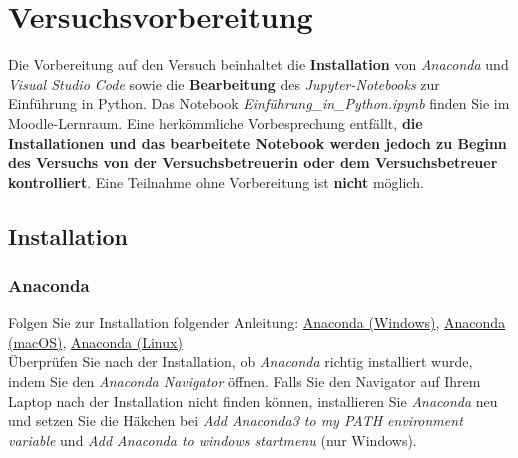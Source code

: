 \documentclass[12pt]{scrbook}
\begin{document}
\section{Versuchsvorbereitung}
\label{PY:Vorbereitung}

Die Vorbereitung auf den Versuch beinhaltet die \textbf{Installation} von \textit{Anaconda} und \textit{Visual Studio Code} sowie die \textbf{Bearbeitung} des \textit{Jupyter-Notebooks} zur Einführung in Python. Das Notebook \textit{Einführung\_in\_Python.ipynb} finden Sie im Moodle-Lernraum. Eine herkömmliche Vorbesprechung entfällt, \textbf{die Installationen und das bearbeitete Notebook werden jedoch zu Beginn des Versuchs von der Versuchsbetreuerin oder dem Versuchsbetreuer kontrolliert}. Eine Teilnahme ohne Vorbereitung ist \textbf{nicht} möglich.

\subsection{Installation}

\subsubsection{Anaconda}
\label{PY:Conda}
Folgen Sie zur Installation folgender Anleitung: \href{https://docs.anaconda.com/free/anaconda/install/windows/}{Anaconda (Windows)}, \href{https://docs.anaconda.com/free/anaconda/install/mac-os/}{Anaconda (macOS)},
\href{https://docs.anaconda.com/free/anaconda/install/linux/}{Anaconda (Linux)}\\
\newline
Überprüfen Sie nach der Installation, ob \textit{Anaconda} richtig installiert wurde, indem Sie den \textit{Anaconda Navigator} öffnen. Falls Sie den Navigator auf Ihrem Laptop nach der Installation nicht finden können, installieren Sie \textit{Anaconda} neu und setzen Sie die Häkchen bei \textit{Add Anaconda3 to my PATH environment variable} und \textit{Add Anaconda to windows startmenu} (nur Windows).
\end{document}
